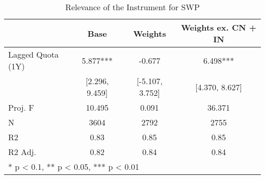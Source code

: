 \begin{table}
\tablefont
\caption{Relevance of the Instrument for SWP\label{tab:iv_rel}}
\centering
\begin{tabular}[t]{lccc}
\toprule
  & Base & Weights & Weights ex. CN + IN\\
\midrule
Lagged Quota (1Y) & 5.877*** & -0.677 & 6.498***\\
 & [2.296, 9.459] & [-5.107, 3.752] & [4.370, 8.627]\\
\midrule
Proj. F & 10.495 & 0.091 & 36.371\\
N & 3604 & 2792 & 2755\\
R2 & 0.83 & 0.85 & 0.85\\
R2 Adj. & 0.82 & 0.84 & 0.84\\
\bottomrule
\multicolumn{4}{l}{\textsuperscript{} * p < 0.1, ** p < 0.05, *** p < 0.01}\\
\end{tabular}
\end{table}
